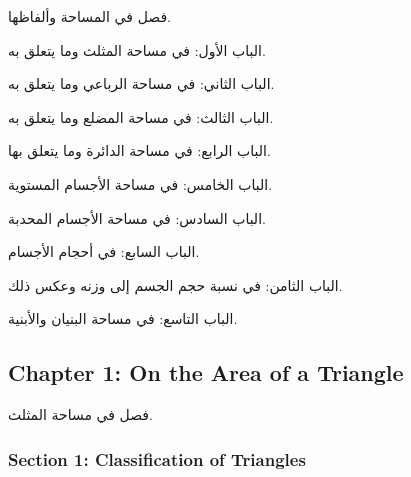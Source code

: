 \documentclass[11pt,a4paper]{article}
\newenvironment{arabicbox}{%

  \begin{framed}

  \begin{minipage}{\linewidth-2\fboxsep-2\fboxrule}

  \setlength{\parindent}{0pt}

  \linespread{1.3}\selectfont

}{%

  \end{minipage}

  \end{framed}

}
\begin{document}
\begin{arabicbox}

\begin{Arabic}

فصل في المساحة وألفاظها.



الباب الأول: في مساحة المثلث وما يتعلق به.



الباب الثاني: في مساحة الرباعي وما يتعلق به.



الباب الثالث: في مساحة المضلع وما يتعلق به.



الباب الرابع: في مساحة الدائرة وما يتعلق بها.



الباب الخامس: في مساحة الأجسام المستوية.



الباب السادس: في مساحة الأجسام المحدبة.



الباب السابع: في أحجام الأجسام.



الباب الثامن: في نسبة حجم الجسم إلى وزنه وعكس ذلك.



الباب التاسع: في مساحة البنيان والأبنية.

\end{Arabic}

\end{arabicbox}



\subsection{Chapter 1: On the Area of a Triangle}



\begin{arabicbox}

\begin{Arabic}

فصل في مساحة المثلث.

\end{Arabic}

\end{arabicbox}



\vspace{0.3cm}



\subsubsection{Section 1: Classification of Triangles}
\end{document}
